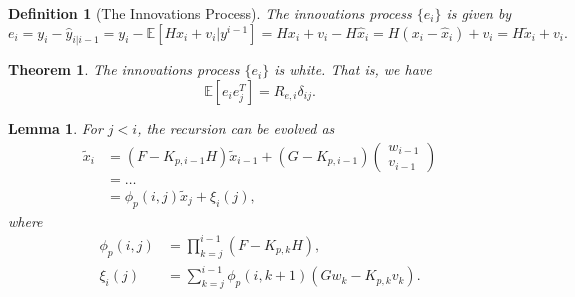 \documentclass[a4 paper]{article}
\numberwithin{equation}{section}
\theoremstyle{boldStyle}
\theoremstyle{boldBlueStyle}
\newtheorem{lemma}{Lemma}[section]
\theoremstyle{boldPurpleStyle}
\newtheorem{theorem}{Theorem}[section]
\theoremstyle{boldRedStyle}
\newtheorem{definition}{Definition}[section]
\theoremstyle{boldGreenStyle}
\begin{document}
\begin{definition}[The Innovations Process]
  The innovations process \( \{e_i\} \) is given by
  \[
  e_i = y_i - \hat{y}_{i|i-1} = y_i - \mathbb{E}[H x_i + v_i | y^{i-1}] = H x_i + v_i - H \hat{x}_i = H (x_i - \hat{x}_i) + v_i = H \tilde{x}_i + v_i.
  \]
\end{definition}


\begin{theorem}
  The innovations process \( \{e_i\} \) is white. That is, we have
  \[
  \mathbb{E}[e_i e_j^T] = R_{e,i} \delta_{ij}.
  \]
\end{theorem}


\begin{lemma}
  For \( j < i \), the recursion can be evolved as
  \begin{align*}
      \tilde{x}_i &= (F - K_{p,i-1}H) \tilde{x}_{i-1} + (G - K_{p,i-1})
      \begin{pmatrix}
          w_{i-1} \\
          v_{i-1}
      \end{pmatrix} \\
      &= \ldots \\
      &= \phi_p(i, j) \tilde{x}_j + \xi_i(j),
  \end{align*}
  where
  \begin{align*}
      \phi_p(i, j) &= \prod_{k=j}^{i-1} (F - K_{p,k}H), \\
      \xi_i(j) &= \sum_{k=j}^{i-1} \phi_p(i, k+1) (G w_k - K_{p,k} v_k).
  \end{align*}
  \end{lemma}  
\end{document}
